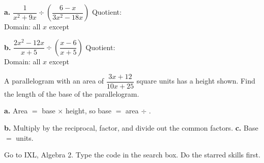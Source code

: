 \begin{minipage}[t]{0.48\textwidth}
\vspace{0pt}
\textbf{a.} $\dfrac{1}{x^2+9x}\div\left(\dfrac{6-x}{3x^2-18x}\right)$
\lines[5]
Quotient: \blank[3.5cm]\\[4pt]
Domain: all $x$ except \blank[2.6cm]
\end{minipage}\hfill
\begin{minipage}[t]{0.48\textwidth}
\vspace{0pt}
\textbf{b.} $\dfrac{2x^2-12x}{x+5}\div\left(\dfrac{x-6}{x+5}\right)$
\lines[5]
Quotient: \blank[3.5cm]\\[4pt]
Domain: all $x$ except \blank[2.6cm]
\end{minipage}

\newpage
\begin{minipage}[t]{0.56\textwidth}
\vspace{0pt}
A parallelogram with an area of $\dfrac{3x+12}{10x+25}$ square units has a height shown. Find the length of the base of the parallelogram.

\vspace{4pt}
\textbf{a.} Area $=$ base $\times$ height, so base $=$ area $\div$ \blank[1.6cm].

\textbf{b.} Multiply by the reciprocal, factor, and divide out the common factors.
\lines[3]
\textbf{c.} Base $=$ \blank[2.5cm] units.
\end{minipage}\hfill
\begin{minipage}[t]{0.40\textwidth}
\vspace{6pt}
\begin{center}
\end{center}
\end{minipage}

Go to IXL, Algebra 2. Type the code in the search box. Do the starred skills first.

